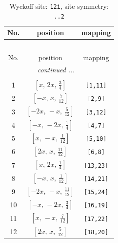 \documentclass[fleqn,8pt]{jsarticle}
\begin{document}
\begin{longtable}{ccc}
\caption{Wyckoff site: {\tt 12i}, site symmetry: {\tt ..2}}
 \\
 \hline \hline
No. & position & mapping \\ \hline \endfirsthead

\multicolumn{2}{l}{\tablename\ \thetable{}} \\
 \hline \hline
No. & position & mapping \\ \hline \endhead

 \hline \hline
\multicolumn{2}{r}{\footnotesize\it continued ...} \\ \endfoot

 \hline \hline
\multicolumn{2}{r}{} \\ \endlastfoot

1 & $\left[ x,\, 2 x,\, \frac{3}{4} \right]$ & {\tt [1,11]} \\ \hline
2 & $\left[ - x,\, x,\, \frac{7}{12} \right]$ & {\tt [2,9]} \\ \hline
3 & $\left[ - 2 x,\, - x,\, \frac{5}{12} \right]$ & {\tt [3,12]} \\ \hline
4 & $\left[ - x,\, - 2 x,\, \frac{1}{4} \right]$ & {\tt [4,7]} \\ \hline
5 & $\left[ x,\, - x,\, \frac{1}{12} \right]$ & {\tt [5,10]} \\ \hline
6 & $\left[ 2 x,\, x,\, \frac{11}{12} \right]$ & {\tt [6,8]} \\ \hline
7 & $\left[ x,\, 2 x,\, \frac{1}{4} \right]$ & {\tt [13,23]} \\ \hline
8 & $\left[ - x,\, x,\, \frac{1}{12} \right]$ & {\tt [14,21]} \\ \hline
9 & $\left[ - 2 x,\, - x,\, \frac{11}{12} \right]$ & {\tt [15,24]} \\ \hline
10 & $\left[ - x,\, - 2 x,\, \frac{3}{4} \right]$ & {\tt [16,19]} \\ \hline
11 & $\left[ x,\, - x,\, \frac{7}{12} \right]$ & {\tt [17,22]} \\ \hline
12 & $\left[ 2 x,\, x,\, \frac{5}{12} \right]$ & {\tt [18,20]} \\
\end{longtable}
\renewcommand{\arraystretch}{1.2}
\end{document}

